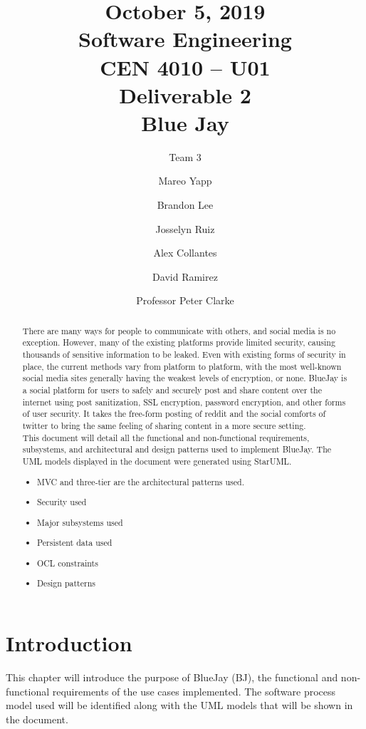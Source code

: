 \documentclass{report}
\begin{document}
\title{October 5, 2019\\Software Engineering\\CEN 4010 – U01\\Deliverable 2\\Blue Jay}

\author{Team 3\and Mareo Yapp\and Brandon Lee\and Josselyn Ruiz\and Alex Collantes\and David Ramirez\and Professor Peter Clarke}
\maketitle

\begin{abstract}
There are many ways for people to communicate with others, and social media is no exception. However, many of the existing platforms provide limited security, causing thousands of sensitive information to be leaked. Even with existing forms of security in place, the current methods vary from platform to platform, with the most well-known social media sites generally having the weakest levels of encryption, or none. BlueJay is a social platform for users to safely and securely post and share content over the internet using post sanitization, SSL encryption, password encryption, and other forms of user security. It takes the free-form posting of reddit and the social comforts of twitter to bring the same feeling of sharing content in a more secure setting.\\
This document will detail all the functional and non-functional requirements, subsystems, and architectural and design patterns used to implement BlueJay. The UML models displayed in the document were generated using StarUML.\\

\begin{itemize}
\item MVC and three-tier are the architectural patterns used.
\item Security used
\item Major subsystems used
\item Persistent data used
\item OCL constraints
\item Design patterns
\end{itemize}
\end{abstract}
 
\tableofcontents

\chapter{Introduction}
	This chapter will introduce the purpose of BlueJay (BJ), the functional and non-functional requirements of the use cases implemented. The software process model used will be identified along with the UML models that will be shown in the document.
\end{document}
